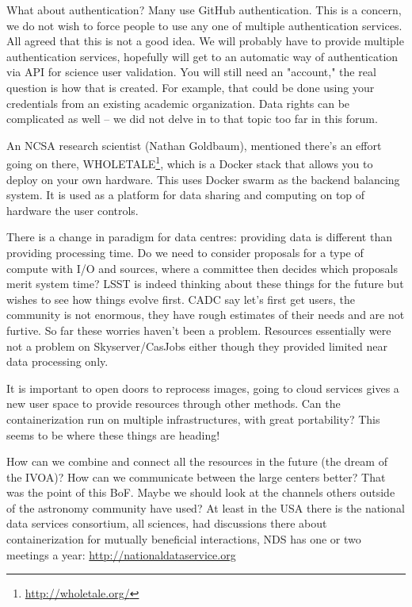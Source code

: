 \documentclass[11pt,twoside]{article}
\begin{document}
What about authentication? Many use GitHub authentication. This is a concern, we do not wish to  force people to use any one of multiple authentication services. All agreed that this is not a good idea.
We will probably have to provide multiple authentication services, hopefully will get to an automatic way of authentication via API for science user validation.
You will still need an "account," the real question is how that is created.
For example, that could be done using your credentials from an existing academic organization.
Data rights can be complicated as well -- we did not delve in to that topic too far in this forum.


An NCSA research scientist (Nathan Goldbaum), mentioned there's an effort going on there, WHOLETALE\footnote{\url{http://wholetale.org/}},  which is a Docker stack that allows you to deploy on your own hardware. This uses Docker swarm as the backend balancing system. It is used as a platform for data sharing and computing on top of hardware the user controls.

There is a change in paradigm for data centres: providing data is different than providing processing time.
Do we need to consider proposals for a type of compute with I/O and sources, where  a committee then decides which proposals merit system time?
LSST is indeed thinking about these things for the future but wishes to see how things evolve first.
CADC say let's first get users, the community is not enormous, they have rough estimates of their needs and are not furtive.
So far these worries haven't been a problem. Resources essentially were not a problem on Skyserver/CasJobs either though they provided limited near data processing only.

It is important to open doors to reprocess images, going to cloud services gives a new user space to provide resources through other methods. Can the containerization run on multiple infrastructures, with great portability?
This seems to be where these things are heading!


How can we combine and connect all the resources in the future (the dream of the IVOA)?
How can we communicate between the large centers better?
That was the point of this BoF.
Maybe we should look at the channels others outside of the astronomy community have used?
At least in the USA there is the  national data services consortium, all sciences, had discussions there about containerization for mutually beneficial interactions, NDS has one or two meetings a year: \url{http://nationaldataservice.org}
\end{document}
